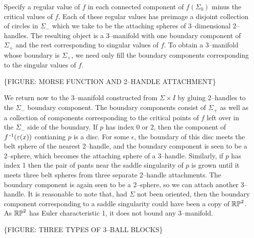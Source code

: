  Specify a regular value of $f$ in each connected component of $f(\Sigma_0)$ minus the critical values of $f$.
Each of these regular values has preimage a disjoint collection of circles in $\Sigma_-$ which we take to be the attaching spheres of 3--dimensional 2--handles. 
The resulting object is a 3--manifold with one boundary component of $\Sigma_+$ and the rest corresponding to singular values of $f$.
To obtain a 3--manifold whose boundary is $\Sigma_+$, we need only fill the boundary components corresponding to the singular values of $f$.

\{FIGURE: MORSE FUNCTION AND 2--HANDLE ATTACHMENT\}



We return now to the 3--manifold constructed from $\Sigma\times I$ by gluing 2--handles to the $\Sigma_-$ boundary component.
The boundary components consist of $\Sigma_+$ as well as a collection of components corresponding to the critical points of $f$ left over in the $\Sigma_-$ side of the boundary.
If $p$ has index 0 or 2, then the component of $f^{\,\text{-}1}(\varepsilon(x))$ contianing $p$ is a disc.
For some $\epsilon$, the boundary of this disc meets the belt sphere of the nearest 2--handle, and the boundary component is seen to be a 2--sphere, which becomes the attaching sphere of a 3--handle.
Similarly, if $p$ has index 1 then the pair of pants near the saddle singularity of $p$ is grown until it meets three belt spheres from three separate 2--handle attachments.
The boundary component is again seen to be a 2--sphere, so we can attach another 3--handle.
It is reasonable to note that, had $\Sigma$ not been oriented, then the boundary component corresponding to a saddle singularity could have been a copy of $\mathbb{RP}^2$.
As $\mathbb{RP}^2$ has Euler characteristic 1, it does not bound any 3--manifold.

\{FIGURE: THREE TYPES OF 3--BALL BLOCKS\}

